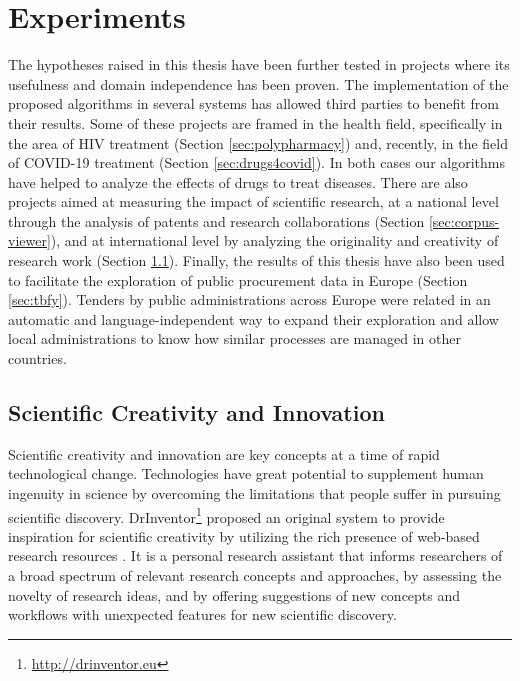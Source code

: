 

\chapter{Experiments}\label{ch:experiments}

\graphicspath{{experiments/figures/}}


The hypotheses raised in this thesis have been further tested in projects where its usefulness and domain independence has been proven. The implementation of the proposed algorithms in several systems  has allowed third parties to benefit from their results. Some of these projects are framed in the health field, specifically in the area of HIV treatment (Section \ref{sec:polypharmacy}) and, recently, in the field of COVID-19 treatment (Section \ref{sec:drugs4covid}). In both cases our algorithms have helped to analyze the effects of drugs to treat diseases. There are also projects aimed at measuring the impact of scientific research, at a national level through the analysis of patents and research collaborations (Section \ref{sec:corpus-viewer}), and at international level by analyzing the originality and creativity of research work (Section \ref{sec:drinventor}). Finally, the results of this thesis have also been used to facilitate the exploration of public procurement data in Europe (Section \ref{sec:tbfy}). Tenders by public administrations across Europe were related in an automatic and language-independent way to expand their exploration and allow local administrations to know how similar processes are managed in other countries.  

\section{Scientific Creativity and Innovation}
\label{sec:drinventor}

Scientific creativity and innovation are key concepts at a time of rapid technological change. Technologies have great potential to supplement human ingenuity in science by overcoming the limitations that people suffer in pursuing scientific discovery. DrInventor\footnote{\url{http://drinventor.eu}} proposed an original system to provide inspiration for scientific creativity by utilizing the rich presence of web-based research resources \citep{Dong2017DrIP}. It is a personal research assistant that informs researchers of a broad spectrum of relevant research concepts and approaches, by assessing the novelty of research ideas, and by offering suggestions of new concepts and workflows with unexpected features for new scientific discovery.

